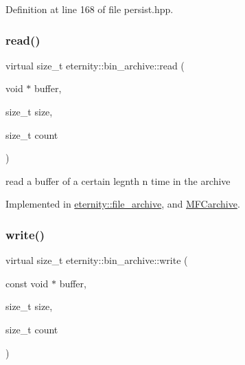 Definition at line 168 of file persist.\+hpp.

\mbox{\label{classeternity_1_1bin__archive_a5d67b032541f5a1e104d2fcd0eaa7a55}} 
\subsubsection{\texorpdfstring{read()}{read()}}
{\footnotesize\ttfamily virtual size\+\_\+t eternity\+::bin\+\_\+archive\+::read (\begin{DoxyParamCaption}\item[{void $\ast$}]{buffer,  }\item[{size\+\_\+t}]{size,  }\item[{size\+\_\+t}]{count }\end{DoxyParamCaption})\hspace{0.3cm}{\ttfamily [pure virtual]}}



read a buffer of a certain legnth n time in the archive 



Implemented in \hyperlink{classeternity_1_1file__archive_a307b43ac9f06c7077ac0f7e48dc0d7ab}{eternity\+::file\+\_\+archive}, and \hyperlink{class_m_f_carchive_a175a083e8f81fe490714be920539f7b9}{M\+F\+Carchive}.

\mbox{\label{classeternity_1_1bin__archive_acbe041b0815f2721ee18ad042557b14e}} 
\subsubsection{\texorpdfstring{write()}{write()}}
{\footnotesize\ttfamily virtual size\+\_\+t eternity\+::bin\+\_\+archive\+::write (\begin{DoxyParamCaption}\item[{const void $\ast$}]{buffer,  }\item[{size\+\_\+t}]{size,  }\item[{size\+\_\+t}]{count }\end{DoxyParamCaption})\hspace{0.3cm}{\ttfamily [pure virtual]}}



